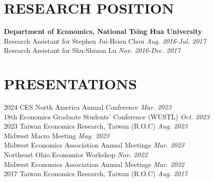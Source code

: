 \documentclass[10pt]{res} %
\begin{document}
\begin{resume}

\section{RESEARCH POSITION}%
\label{sec:research_position}

\vspace{8pt} %

{\bf Department of Economics, National Tsing Hua University} \\
Research Assistant for Stephen Jui-Hsien Chou \hfill  \textit{Aug. 2016-Jul. 2017} \\
Research Assistant for Shu-Shiuan Lu \hfill  \textit{Nov. 2016-Dec. 2017} \\

\vspace{-10pt}

\section{PRESENTATIONS}%
\label{sub:conference_paper}
2024 CES North America Annual Conference \hfill \textit{Mar. 2023} \\
18th Economics Graduate Students' Conference (WUSTL) \hfill \textit{Oct. 2023} \\
2023 Taiwan Economics Research, Taiwan (R.O.C) \hfill  \textit{Aug. 2023} \\
Midwest Macro Meeting \hfill \textit{May. 2023} \\
Midwest Economics Association Annual Meetings \hfill \textit{Mar. 2023} \\
Northeast Ohio Economics Workshop \hfill \textit{Nov. 2022} \\
Midwest Economics Association Annual Meetings \hfill \textit{Mar. 2022} \\
2017 Taiwan Economics Research, Taiwan (R.O.C) \hfill  \textit{Aug. 2017} \\

\vspace{-10pt}


\end{resume}
\end{document}
